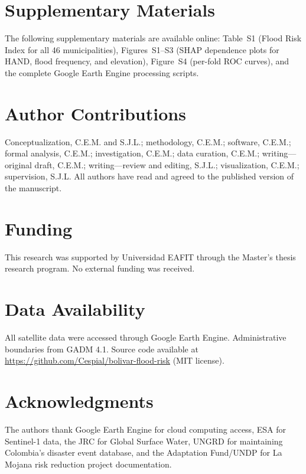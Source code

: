 \documentclass{article}
\begin{document}
\section*{Supplementary Materials}

The following supplementary materials are available online: Table~S1 (Flood Risk Index for all 46 municipalities), Figures~S1--S3 (SHAP dependence plots for HAND, flood frequency, and elevation), Figure~S4 (per-fold ROC curves), and the complete Google Earth Engine processing scripts.

\section*{Author Contributions}

Conceptualization, C.E.M. and S.J.L.; methodology, C.E.M.; software, C.E.M.; formal analysis, C.E.M.; investigation, C.E.M.; data curation, C.E.M.; writing---original draft, C.E.M.; writing---review and editing, S.J.L.; visualization, C.E.M.; supervision, S.J.L. All authors have read and agreed to the published version of the manuscript.

\section*{Funding}

This research was supported by Universidad EAFIT through the Master's thesis research program. No external funding was received.

\section*{Data Availability}

All satellite data were accessed through Google Earth Engine. Administrative boundaries from GADM 4.1. Source code available at \url{https://github.com/Cespial/bolivar-flood-risk} (MIT license).

\section*{Acknowledgments}

The authors thank Google Earth Engine for cloud computing access, ESA for Sentinel-1 data, the JRC for Global Surface Water, UNGRD for maintaining Colombia's disaster event database, and the Adaptation Fund/UNDP for La Mojana risk reduction project documentation.
\end{document}
